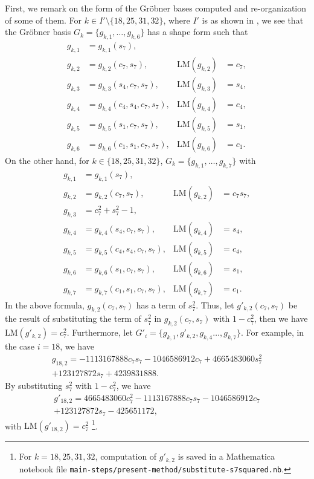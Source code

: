 \documentclass{birkjour}
\theoremstyle{plain}
\theoremstyle{definition}
\newcommand{\lm}{\mathrm{LM}}
\begin{document}
    First, we remark on the form of the Gr\"obner bases 
    computed and re-organization of some of them. For $k\in I'\setminus\{18,25,31,32\}$, 
    where $I'$ is as shown in , 
    we see that the Gr\"obner basis $G_k=\{g_{k,1},\dots,g_{k,6}\}$ has a shape form such that
    \begin{align*}
        g_{k,1} &= g_{k,1}(s_7), \\
        g_{k,2} &= g_{k,2}(c_7,s_7), & \lm({g}_{k,2}) &= c_7, \\
        g_{k,3} &= g_{k,3}(s_4,c_7,s_7), &
        \lm(g_{k,3}) &= s_4, \\
        g_{k,4} &= g_{k,4}(c_4,s_4,c_7,s_7), & \lm(g_{k,4}) &= c_4, \\
        g_{k,5} &= g_{k,5}(s_1,c_7,s_7), &
        \lm(g_{k,5}) &= s_1, \\
        g_{k,6} &= g_{k,6}(c_1,s_1,c_7,s_7), & \lm(g_{k,6}) &= c_1.
    \end{align*}
    On the other hand, for $k\in\{18,25,31,32\}$, $G_k=\{g_{k,1},\dots,g_{k,7}\}$ with
    \begin{align*}
        g_{k,1} &= g_{k,1}(s_7), \\
        g_{k,2} &= g_{k,2}(c_7,s_7), & \lm(g_{k,2}) &= c_7s_7, \\
        g_{k,3} &= c_7^2+s_7^2-1, \\
        g_{k,4} &= g_{k,4}(s_4,c_7,s_7), & \lm(g_{k,4}) &= s_4, \\
        g_{k,5} &= g_{k,5}(c_4,s_4,c_7,s_7), &
        \lm(g_{k,5}) &= c_4, \\
        g_{k,6} &= g_{k,6}(s_1,c_7,s_7), & \lm(g_{k,6}) &= s_1, \\ 
        g_{k,7} &= g_{k,7}(c_1,s_1,c_7,s_7), & \lm(g_{k,7}) &= c_1.
    \end{align*}
    In the above formula, $g_{k,2}(c_7,s_7)$ has a term of $s_7^2$.
    Thus, let 
    $g'_{k,2}(c_7,s_7)$ be the result of substituting 
    the term of $s_7^2$ in $g_{k,2}(c_7,s_7)$ with $1-c_7^2$,
    then we have $\lm(g'_{k,2})=c_7^2$. 
    Furthermore, let $G'_i=\{g_{k,1},g'_{k,2},g_{k,4}\dots,g_{k,7}\}$.
    For example, in the case $i=18$, we have
    \begin{multline*}
        g_{18,2}  =
        - 1113167888 c_7 s_7
        - 1046586912 c_7
        + 4665483060 s_7^2\\
        + 123127872 s_7
        + 4239831888.
    \end{multline*}
    By substituting $s_7^2$ with $1-c_7^2$, we have
    \begin{multline*}
        g'_{18,2} =
        4665483060 c_7^2
        -1113167888 c_7 s_7
        - 1046586912 c_7\\
        + 123127872 s_7 
        -425651172,
    \end{multline*}
    with $\lm(g'_{18,2})=c_7^2$ \footnote{For $k=18,25,31,32$, computation of 
    $g'_{k,2}$ is saved in a Mathematica notebook file
    \texttt{main-steps/present-method/substitute-s7squared.nb}.}.
    
\end{document}
